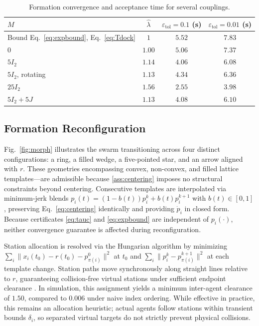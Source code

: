 \documentclass[letterpaper, 10 pt, conference]{ieeeconf}
\begin{document}
\begin{table}[t]
\centering
\caption{Formation convergence and acceptance time for several
couplings.}
\label{tab:formation}
\begin{tabular}{@{}lccc@{}}
\toprule
$M$ & $\hat\lambda$ & $\varepsilon_{\mathrm{tol}}=0.1$ (s)
& $\varepsilon_{\mathrm{tol}}=0.01$ (s) \\
\midrule
Bound Eq.~\eqref{eq:expbound}, Eq.~\eqref{eq:Tdock} & $1$ & $5.52$ & $7.83$ \\
\midrule
$0$ & $1.00$ & $5.06$ & $7.37$ \\
$5I_2$ & $1.14$ & $4.06$ & $6.08$ \\
$5I_2$, rotating & $1.13$ & $4.34$ & $6.36$ \\
$25I_2$ & $1.56$ & $2.55$ & $3.98$ \\
$5I_2+5J$ & $1.13$ & $4.08$ & $6.10$ \\
\bottomrule
\end{tabular}
\end{table}

\subsection{Formation Reconfiguration}
\label{sec:num_morph}

Fig.~\ref{fig:morph} illustrates the swarm transitioning across four distinct configurations: a ring, a filled wedge, a five-pointed star, and an arrow aligned with $r$. These geometries encompassing convex, non-convex, and filled lattice templates—are admissible because \cref{ass:centering} imposes no structural constraints beyond centering. Consecutive templates are interpolated via minimum-jerk blends $p_i(t)=(1-b(t))p_i^k + b(t)p_i^{k+1}$ with $b(t)\in[0,1]$, preserving Eq.~\eqref{eq:centering} identically and providing $\dot p_i$ in closed form. Because certificates \eqref{eq:tauc} and \eqref{eq:expbound} are independent of $p_i(\cdot)$, neither convergence guarantee is affected during reconfiguration.

Station allocation is resolved via the Hungarian algorithm \cite{kuhn1955hungarian} by minimizing $\sum_i\lVert x_i(t_0)-r(t_0)-p^{0}_{\pi(i)}\rVert^2$ at $t_0$ and $\sum_i\lVert p^{k}_i-p^{k+1}_{\pi(i)}\rVert^2$ at each template change. Station paths move synchronously along straight lines relative to $r$, guaranteeing collision-free virtual stations under sufficient endpoint clearance \cite{turpin2014capt}. In simulation, this assignment yields a minimum inter-agent clearance of $1.50$, compared to $0.006$ under naive index ordering. While effective in practice, this remains an allocation heuristic; actual agents follow stations within transient bounds $\delta_i$, so separated virtual targets do not strictly prevent physical collisions.
\end{document}
